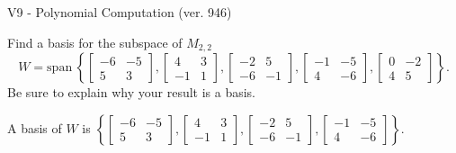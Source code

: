 \begin{exercise}
  \begin{exerciseTitle}V9 - Polynomial Computation (ver. 946)\end{exerciseTitle}
  \begin{exerciseStatement}
    Find a basis for the subspace of \(M_{2,2}\) 
\[W=\mathrm{span}\ \left\{\left[\begin{array}{cc}
-6 & -5 \\
5 & 3
\end{array}\right] , \left[\begin{array}{cc}
4 & 3 \\
-1 & 1
\end{array}\right] , \left[\begin{array}{cc}
-2 & 5 \\
-6 & -1
\end{array}\right] , \left[\begin{array}{cc}
-1 & -5 \\
4 & -6
\end{array}\right] , \left[\begin{array}{cc}
0 & -2 \\
4 & 5
\end{array}\right]\right\}.\]
 Be sure to explain why your result is a basis.


  \end{exerciseStatement}
  \begin{exerciseAnswer}
   A basis of \(W\) is  \(\left\{\left[\begin{array}{cc}
-6 & -5 \\
5 & 3
\end{array}\right] , \left[\begin{array}{cc}
4 & 3 \\
-1 & 1
\end{array}\right] , \left[\begin{array}{cc}
-2 & 5 \\
-6 & -1
\end{array}\right] , \left[\begin{array}{cc}
-1 & -5 \\
4 & -6
\end{array}\right]\right\}\).
  


  \end{exerciseAnswer}
\end{exercise}